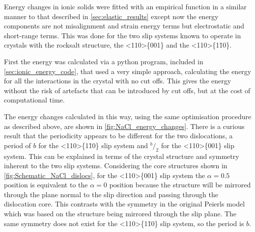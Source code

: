 Energy changes in ionic solids were fitted with an empirical function in a similar manner to that described in \autoref{sec:elastic_results} except now the energy components are not misalignment and strain energy terms but electrostatic and short-range terms. This was done for the two slip systems known to operate in crystals with the rocksalt structure, the <110>\{001\} and the <110>\{1\={1}0\}.


First the energy was calculated via a python program, included in \autoref{sec:ionic_energy_code}, that used a very simple approach, calculating the energy for all the interactions in the crystal with no cut offs. This gives the energy without the risk of artefacts that can be introduced by cut offs, but at the cost of computational time.


The energy changes calculated in this way, using the same optimisation procedure as described above, are shown in \ref{fig:NaCl_energy_changes}. There is a curious result that the periodicity appears to be different for the two dislocations, a period of $b$ for the <110>\{1\={1}0\} slip system and $^b\!/_2$ for the <110>\{001\} slip system. This can be explained in terms of the crystal structure and symmetry inherent to the two slip systems. Considering the core structures shown in \autoref{fig:Schematic_NaCl_dislocs}, for the <110>\{001\} slip system the $\alpha=0.5$ position is equivalent to the $\alpha=0$ position because the structure will be mirrored through the plane normal to the slip direction and passing through the dislocation core. This contrasts with the symmetry in the original Peierls model which was based on the structure being mirrored through the slip plane. The same symmetry does not exist for the <110>\{1\={1}0\} slip system, so the period is $b$.

